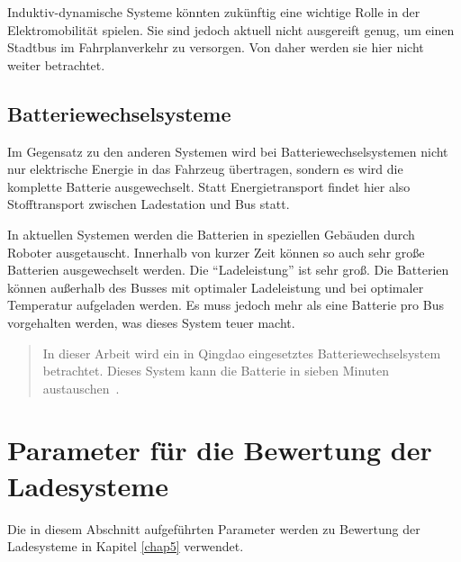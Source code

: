Induktiv-dynamische Systeme könnten zukünftig eine wichtige Rolle in der Elektromobilität spielen. Sie sind jedoch aktuell nicht ausgereift genug, um einen Stadtbus im Fahrplanverkehr zu versorgen. Von daher werden sie hier nicht weiter betrachtet. 

\subsection{Batteriewechselsysteme}
Im Gegensatz zu den anderen Systemen wird bei Batteriewechselsystemen nicht nur elektrische Energie in das Fahrzeug übertragen, sondern es wird die komplette Batterie ausgewechselt. Statt Energietransport findet hier also Stofftransport zwischen Ladestation und Bus statt. 

In aktuellen Systemen werden die Batterien in speziellen Gebäuden durch Roboter ausgetauscht. Innerhalb von kurzer Zeit können so auch sehr große Batterien ausgewechselt werden. Die "`Ladeleistung"' ist sehr groß. Die Batterien können außerhalb des Busses mit optimaler Ladeleistung und bei optimaler Temperatur aufgeladen werden. Es muss jedoch mehr als eine Batterie pro Bus vorgehalten werden, was dieses System teuer macht.

\begin{quotation}
	In dieser Arbeit wird ein in Qingdao eingesetztes Batteriewechselsystem betrachtet. Dieses System kann die Batterie in sieben Minuten austauschen~\cite{swapQingdao}.
\end{quotation}

\section{Parameter für die Bewertung der Ladesysteme}
\label{parameterDirekt}
Die in diesem Abschnitt aufgeführten Parameter werden zu Bewertung der Ladesysteme in Kapitel \ref{chap5} verwendet.


